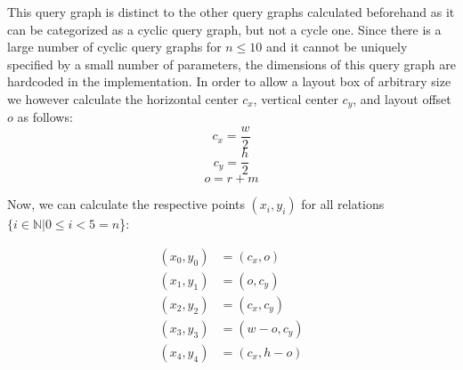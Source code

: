 This query graph is distinct to the other query graphs calculated beforehand as it can be categorized as a cyclic query graph, but not a cycle one. Since there is a large number of cyclic query graphs for $n \leq 10$ and it cannot be uniquely specified by a small number of parameters, the dimensions of this query graph are hardcoded in the implementation. In order to allow a layout box of arbitrary size we however calculate the horizontal center $c_x$, vertical center $c_y$, and layout offset $o$ as follows:
\begin{equation}
    c_x = \frac{w}{2}
\end{equation}
\begin{equation}
    c_y = \frac{h}{2}
\end{equation}
\begin{equation}
    o = r + m
\end{equation}

Now, we can calculate the respective points $(x_i, y_i)$ for all relations $\{i \in \mathbb{N} \vert 0 \leq i < 5 = n$\}:

\begin{equation}
    \begin{aligned}
        (x_0, y_0) &= (c_x,o)\\
        (x_1, y_1) &= (o,c_y)\\
        (x_2, y_2) &= (c_x,c_y)\\
        (x_3, y_3) &= (w-o,c_y)\\
        (x_4, y_4) &= (c_x,h-o)\\
    \end{aligned}
\end{equation}